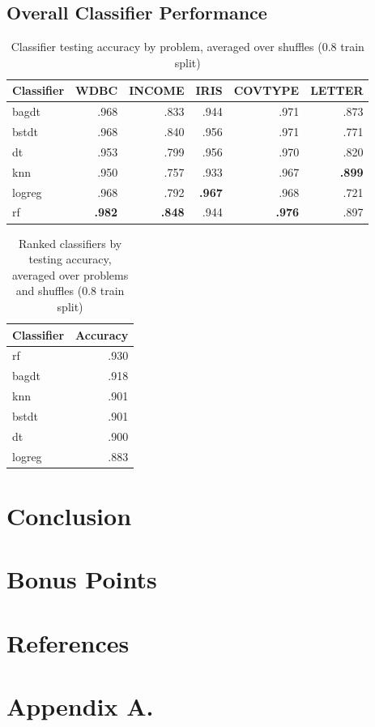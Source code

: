 \documentclass[twoside,11pt]{article}
\begin{document}
		\subsection{Overall Classifier Performance}
			\begin{table}[h]
				\caption{Classifier testing accuracy by problem, averaged over shuffles (0.8 train split)}
				\begin{tabular}{lrrrrr}
					\toprule
					Classifier & WDBC & INCOME & IRIS & COVTYPE & LETTER \\
					\midrule
					bagdt  & .968 &   .833 & .944 &    .971 &   .873 \\
					bstdt  & .968 &   .840 & .956 &    .971 &   .771 \\
					dt     & .953 &   .799 & .956 &    .970 &   .820 \\
					knn    & .950 &   .757 & .933 &    .967 &   \textbf{.899} \\
					logreg & .968 &   .792 & \textbf{.967} &    .968 &   .721 \\
					rf     & \textbf{.982} &   \textbf{.848} & .944 &    \textbf{.976} &   .897 \\
					\bottomrule
				\end{tabular}
			\end{table}
		
			\begin{table}[h]
				\caption{Ranked classifiers by testing accuracy, averaged over problems and shuffles (0.8 train split)}
				\begin{tabular}{lr}
					\toprule
					{Classifier} & Accuracy \\
					\midrule
					rf     &     .930 \\
					bagdt  &     .918 \\
					knn    &     .901 \\
					bstdt  &     .901 \\
					dt     &     .900 \\
					logreg &     .883 \\
					\bottomrule
				\end{tabular}
			\end{table}
	
	\section{Conclusion}
	
	\section{Bonus Points}
	
	\section{References}
	
	
	
	
	
	
	
	\newpage
	
	\appendix
	\section*{Appendix A.}
	\label{app:theorem}
	
	
	
	\vskip 0.2in
	
	
\end{document}
